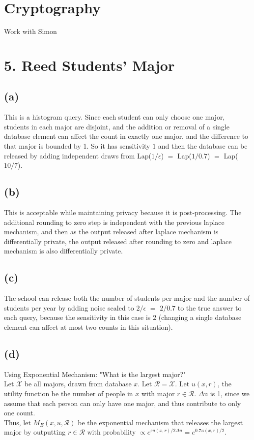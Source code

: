 \documentclass{article}
\begin{document}
\section*{Cryptography} 
Work with Simon
\section*{5. Reed Students' Major}
\subsection*{(a)}
This is a histogram query. Since each student can only choose one major, students in each major are disjoint, and the addition or removal of a single database element can affect the count in exactly one major, and the difference to that major is bounded by 1. So it has sensitivity $1$ and then the database can be released by adding independent draws from Lap($1/\epsilon$) $=$  Lap($1/0.7$) $=$ Lap($10/7$).

\subsection*{(b)}
This is acceptable while maintaining privacy because it is post-processing. The additional rounding to zero step is independent with the previous laplace mechanism, and then as the output released after laplace mechanism is differentially private, the output released after rounding to zero and laplace mechanism is also differentially private.

\subsection*{(c)}
The school can release both the number of students per major and the number of students per year by adding noise scaled to $2/\epsilon$ $=$ $2/0.7$ to the true answer to each query, because the sensitivity in this case is $2$ (changing a single database element can affect at most two counts in this situation).

\subsection*{(d)}
Using Exponential Mechanism: "What is the largest major?"\\
Let $\mathcal{X}$ be all majors, drawn from database $x$. Let $\mathcal{R} = \mathcal{X}$. Let $u(x,r)$, the utility function be the number of people in $x$ with major $r \in \mathcal{R}$. $\Delta$u is 1, since we assume that each person can only have one major, and thus contribute to only one count.\\ Thus, let $M_{E}(x,u,\mathcal{R})$ be the exponential mechanism that releases the largest major by outputting $r \in \mathcal{R}$ with probability $\propto e^{\epsilon u(x,r)/2\Delta{u}} = e^{0.7 u(x,r)/2}$.\\
\end{document}
